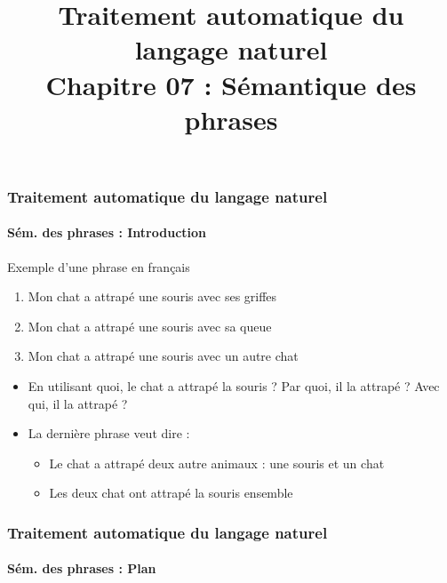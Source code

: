 \documentclass[xcolor=table]{beamer}
\title[TALN : 07- Sém. des phrases]%
{Traitement automatique du langage naturel\\Chapitre 07 : Sémantique des phrases}
\begin{document}
	
\begin{frame}
\frametitle{Traitement automatique du langage naturel}
\framesubtitle{Sém. des phrases : Introduction}

\begin{exampleblock}{Exemple d'une phrase en français}
	\begin{center}
		\Large\bfseries
		\begin{enumerate}
			\item Mon chat a attrapé une souris avec ses griffes 
			\item Mon chat a attrapé une souris avec sa queue
			\item Mon chat a attrapé une souris avec un autre chat
		\end{enumerate}
	\end{center}
\end{exampleblock}

\begin{itemize}
	\item En utilisant quoi, le chat a attrapé la souris ? Par quoi, il la attrapé ? Avec qui, il la attrapé ?
	\item La dernière phrase veut dire : 
	\begin{itemize}
		\item Le chat a attrapé deux autre animaux : une souris et un chat
		\item Les deux chat ont attrapé la souris ensemble
	\end{itemize}
\end{itemize}

\end{frame}

%
%

\begin{frame}
\frametitle{Traitement automatique du langage naturel}
\framesubtitle{Sém. des phrases : Plan}

\begin{multicols}{2}
\tableofcontents
\end{multicols}
\end{frame}

\end{document}
